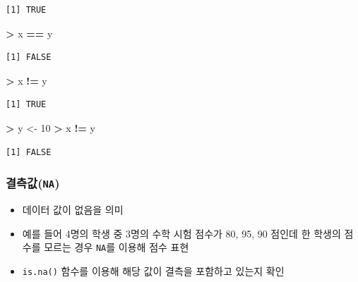 \documentclass[11pt,a4paper]{book}
\newenvironment{Shaded}{\begin{snugshade}}{\end{snugshade}}
\newcommand{\DecValTok}[1]{\textcolor[rgb]{0.00,0.00,0.81}{#1}}
\newcommand{\StringTok}[1]{\textcolor[rgb]{0.31,0.60,0.02}{#1}}
\newcommand{\OperatorTok}[1]{\textcolor[rgb]{0.81,0.36,0.00}{\textbf{#1}}}
\newcommand{\NormalTok}[1]{#1}
\providecommand{\tightlist}{%
  \setlength{\itemsep}{0pt}\setlength{\parskip}{0pt}}
\theoremstyle{definition}
\theoremstyle{definition}
\theoremstyle{definition}
\theoremstyle{remark}
\begin{document}
\begin{verbatim}
[1] TRUE
\end{verbatim}

\begin{Shaded}
\begin{Highlighting}[]
\OperatorTok{>}\StringTok{ }\NormalTok{x }\OperatorTok{==}\StringTok{ }\NormalTok{y}
\end{Highlighting}
\end{Shaded}

\begin{verbatim}
[1] FALSE
\end{verbatim}

\begin{Shaded}
\begin{Highlighting}[]
\OperatorTok{>}\StringTok{ }\NormalTok{x }\OperatorTok{!=}\StringTok{ }\NormalTok{y}
\end{Highlighting}
\end{Shaded}

\begin{verbatim}
[1] TRUE
\end{verbatim}

\begin{Shaded}
\begin{Highlighting}[]
\OperatorTok{>}\StringTok{ }\NormalTok{y <-}\StringTok{ }\DecValTok{10}
\OperatorTok{>}\StringTok{ }\NormalTok{x }\OperatorTok{!=}\StringTok{ }\NormalTok{y}
\end{Highlighting}
\end{Shaded}

\begin{verbatim}
[1] FALSE
\end{verbatim}

\normalsize

\subsubsection{\texorpdfstring{결측값(\texttt{NA})}{결측값(NA)}}\label{na}

\begin{itemize}
\tightlist
\item
  데이터 값이 없음을 의미
\item
  예를 들어 4명의 학생 중 3명의 수학 시험 점수가 80, 95, 90 점인데 한
  학생의 점수를 모르는 경우 \texttt{NA}를 이용해 점수 표현
\item
  \texttt{is.na()} 함수를 이용해 해당 값이 결측을 포함하고 있는지 확인
\end{itemize}
\end{document}
